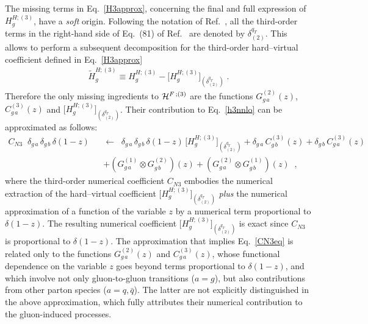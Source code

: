 \documentclass[12pt]{article}
\def\beeq{\begin{eqnarray}}
\def\eeeq{\end{eqnarray}}
\def\nn{\nonumber}
\DeclareRobustCommand{\qt}{q_T}
\begin{document}
The missing terms in Eq.~\eqref{H3approx}, concerning the final and full expression of $H^{H;(3)}_g$, have a {\em soft} origin. Following the notation of Ref.~\cite{Catani:2013tia}, all the third-order terms in the right-hand side of Eq.~(81) of Ref.~\cite{Catani:2013tia} are denoted by $\delta^{\qt}_{(2)}$. This allows to perform a subsequent decomposition for the third-order hard--virtual coefficient defined in Eq.~\eqref{H3approx}
\beeq
\label{H3deltaqT2}
\widetilde{H}^{H;(3)}_{g}  \equiv H^{H;(3)}_g  -  \big[H^{H;(3)}_{g}\big]_{(\delta^{\qt}_{(2)})} \;.
\eeeq
Therefore the only missing ingredients to ${\cal H}^{F \,;(3)}$  are 
 the functions $G^{(2)}_{g\,a}(z)$, $C^{(3)}_{g\,a}(z)$ and $ \big[H^{H;(3)}_{g}\big]_{(\delta^{\qt}_{(2)})}$. 
 Their contribution to  Eq.~\eqref{h3nnlo} can be approximated as follows:
\beeq
\label{CN3eq}
C_{N3}\;\;\delta_{g\,a} \,\delta_{g\,b} \,\delta(1-z) && \!\!\!\!\!\! \leftarrow\;\; \delta_{g\,a} \,\delta_{g\,b} \,\delta(1-z)
\,\big[H^{H;(3)}_{g}\big]_{(\delta^{\qt}_{(2)})}
+\delta_{g\,a} \,C^{(3)}_{g\,b}(z)+\delta_{g\,b} \,C^{(3)}_{g\,a}(z)\nn\\
&&
+\left(G^{(1)}_{g\,a}\otimes G^{(2)}_{g\,b}\right)(z)+\left(G^{(2)}_{g\,a}\otimes G^{(1)}_{g\,b}\right)(z) \;\;, 
\eeeq
where the third-order numerical coefficient $C_{N3}$ embodies the numerical extraction of the hard--virtual coefficient $\big[H^{H;(3)}_{g}\big]_{(\delta^{\qt}_{(2)})}$  \textit{plus} the numerical approximation of a function of the variable $z$ by a numerical term proportional to $\delta(1-z)$. The resulting numerical coefficient $\big[H^{H;(3)}_{g}\big]_{(\delta^{\qt}_{(2)})}$ is exact since $C_{N3}$ is proportional to $\delta(1-z)$. The approximation that implies Eq.~\eqref{CN3eq} is related only to the functions  $G^{(2)}_{g\,a}(z)$ and $C^{(3)}_{g\,a}(z)$, whose functional dependence on the variable $z$ goes beyond terms proportional to $\delta(1-z)$, and which involve not only gluon-to-gluon transitions ($a=g$), but also contributions from 
other parton species ($a=q,\bar q$). The latter are not explicitly distinguished in the above approximation, which fully 
attributes their numerical contribution to the gluon-induced processes. 
\end{document}
